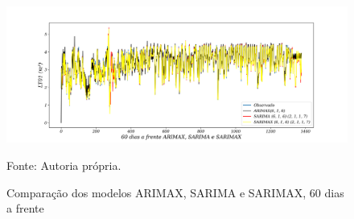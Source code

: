 \begin{figure}[H]
	\centering
	\caption{Comparação dos modelos ARIMAX, SARIMA e SARIMAX, 60 dias a frente }
	\label{fig:60-ARIMAX-SARIMA-SARIMAX}
	\includegraphics[width=1\linewidth]{Apendices/Figuras/modelagem-18-a-21h/60-ARIMAX-SARIMA-SARIMAX}
	
	Fonte: Autoria própria.
\end{figure}